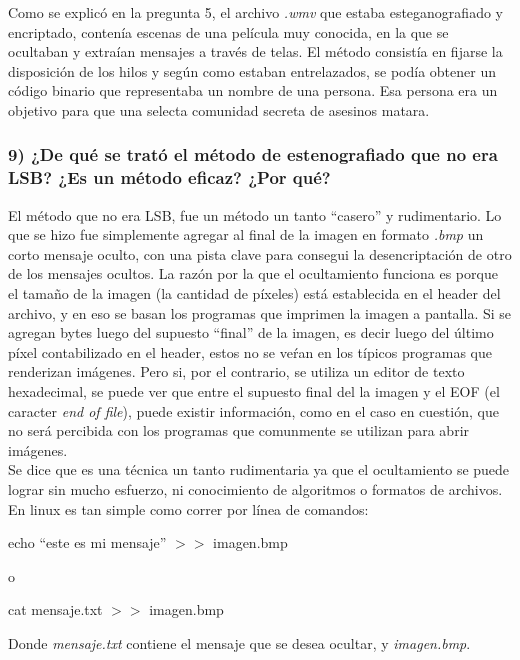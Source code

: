 \documentclass[a4paper,10pt]{article}
\begin{document}
Como se explicó en la pregunta 5, el archivo \textit{.wmv} que estaba esteganografiado y encriptado, contenía escenas de una película muy conocida, en la que se 
ocultaban y extraían mensajes a través de telas. El método consistía en fijarse la disposición de los hilos y según como estaban entrelazados, se podía obtener un código 
binario que representaba un nombre de una persona. Esa persona era un objetivo para que una selecta comunidad secreta de asesinos matara.

\subsubsection*{ 9) ¿De qué se trató el método de estenografiado que no era LSB? ¿Es un método eficaz? ¿Por qué?}

El método que no era LSB, fue un método un tanto ``casero'' y rudimentario. Lo que se hizo fue simplemente agregar al final de la imagen en formato \textit{.bmp} un corto mensaje 
oculto, con una pista clave para consegui la desencriptación de otro de los mensajes ocultos. La razón por la que el ocultamiento funciona es porque el tamaño de la imagen (la cantidad
de píxeles) está establecida en el header del archivo, y en eso se basan los programas que imprimen la imagen a pantalla. Si se agregan bytes luego del supuesto ``final'' de la imagen, 
es decir luego del último píxel contabilizado en el header, estos no se veŕan en los típicos programas que renderizan imágenes. Pero si, por el contrario, se utiliza un editor de texto
hexadecimal, se puede ver que entre el supuesto final del la imagen y el EOF (el caracter \textit{end of file}), puede existir información, como en el caso en cuestión, que no será
percibida con los programas que comunmente se utilizan para abrir imágenes.\\

Se dice que es una técnica un tanto rudimentaria ya que el ocultamiento se puede lograr sin mucho esfuerzo, ni conocimiento de algoritmos o formatos de archivos. En linux es tan simple 
como correr por línea de comandos:

\begin{center}
    echo ``este es mi mensaje'' $>>$ imagen.bmp
\end{center}
o
\begin{center}
    cat mensaje.txt $>>$ imagen.bmp
\end{center}

Donde \textit{mensaje.txt} contiene el mensaje que se desea ocultar, y \textit{imagen.bmp}.\\
\end{document}
